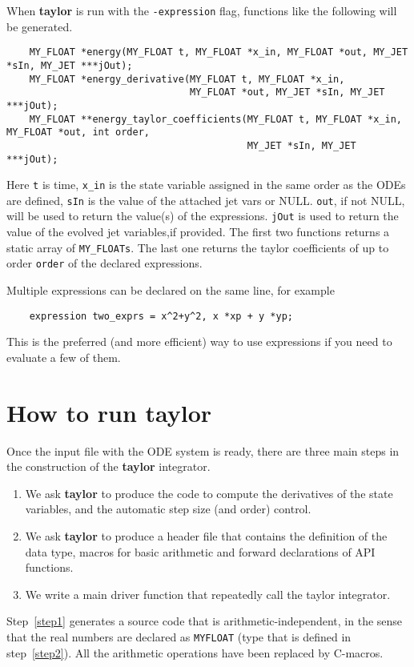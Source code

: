 \documentclass[10pt]{article}
\theoremstyle{remark}
\newcommand{\taylorname}{{\bf taylor}}
\newcommand{\myfloat}{{\tt MY\symbol{95}FLOAT}}
\begin{document}
When \taylorname{} is run with the \verb+-expression+ flag, functions
like the following will be generated.
\begin{verbatim}    
    MY_FLOAT *energy(MY_FLOAT t, MY_FLOAT *x_in, MY_FLOAT *out, MY_JET *sIn, MY_JET ***jOut);
    MY_FLOAT *energy_derivative(MY_FLOAT t, MY_FLOAT *x_in, 
                                MY_FLOAT *out, MY_JET *sIn, MY_JET ***jOut);
    MY_FLOAT **energy_taylor_coefficients(MY_FLOAT t, MY_FLOAT *x_in, MY_FLOAT *out, int order,
                                          MY_JET *sIn, MY_JET ***jOut);
\end{verbatim}
Here \verb+t+ is time, \verb+x_in+ is the state variable assigned in
the same order as the ODEs are defined, \verb+sIn+ is the value of the
attached jet vars or NULL.  \verb+out+, if not NULL, will be used to
return the value(s) of the expressions. \verb+jOut+ is used to return
the value of the evolved jet variables,if provided.  The first two
functions returns a static array of \verb+MY_FLOATs+. The last one
returns the taylor coefficients of up to order \verb+order+ of the
declared expressions.

\bigskip
Multiple expressions can be declared on the same line, for example
\begin{verbatim}
    expression two_exprs = x^2+y^2, x *xp + y *yp;
\end{verbatim}
This is the preferred (and more efficient) way to use expressions if
you need to evaluate a few of them.  \fi


\section{How to run \taylorname{}}

Once the input file with the ODE system is ready, there are three main
steps in the construction of the \taylorname{} integrator.

\begin{enumerate}
\renewcommand{\theenumi}{\arabic{enumi}}
\renewcommand{\labelenumi}{\theenumi.)}
    \item\label{step1} We ask \taylorname{} to produce the code to
      compute the derivatives of the state variables, and the
      automatic step size (and order) control.
    \item\label{step2} We ask \taylorname{} to produce a header file
      that contains the definition of the data type, macros for basic
      arithmetic and forward declarations of API functions.
    \item\label{step3} We write a main driver function that repeatedly
      call the taylor integrator.
\end{enumerate}
Step~\ref{step1} generates a source code that is
arithmetic-independent, in the sense that the real numbers are
declared as \myfloat{} (type that is defined in step~\ref{step2}). All
the arithmetic operations have been replaced by C-macros. 
\end{document}

